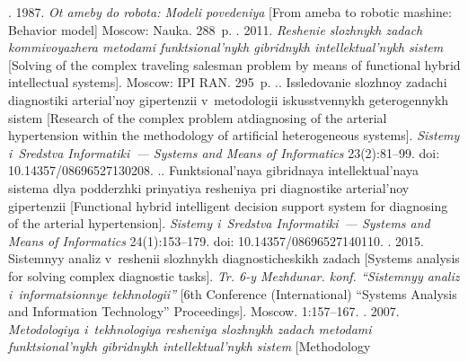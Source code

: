   \begin{multicols}{2}

\renewcommand{\bibname}{\protect\rmfamily References}

{\small\frenchspacing
 {%
 \begin{thebibliography}{99}
. 1987. \textit{Ot ameby do robota: Modeli 
povedeniya} [From ameba to robotic mashine: Behavior model] Moscow: Nauka. 288~p.
. 2011. \textit{Reshenie 
slozhnykh zadach kommivoyazhera metodami funktsional'nykh gibridnykh intellektual'nykh 
sistem} [Solving of the complex traveling salesman problem by means of functional hybrid 
intellectual systems]. Moscow: IPI RAN. 295~p.
.. Issledovanie slozhnoy 
zadachi diagnostiki arterial'noy gipertenzii v~metodologii iskusstvennykh geterogennykh sistem 
[Research of the complex problem at\linebreak diagnosing of the arterial hypertension within the 
methodology of artificial heterogeneous systems]. \textit{Sistemy i~Sredstva Informatiki~--- 
Systems and Means of Informatics} 23(2):81--99. doi: 10.14357/08696527130208.
.. Funktsional'naya 
gibridnaya intellektual'naya sistema dlya podderzhki prinyatiya resheniya pri diagnostike 
arterial'noy gipertenzii [Functional hybrid intelligent decision support system for diagnosing of the 
\mbox{arterial} hypertension]. \textit{Sistemy i~Sredstva Informatiki~--- Systems and Means of Informatics} 
24(1):153--179. doi: 10.14357/08696527140110. 
. 2015. 
Sistemnyy analiz v~reshenii slozhnykh diagnosticheskikh zadach [Systems analysis for solving 
complex diagnostic tasks]. \textit{Tr. 6-y Mezhdunar. konf. ``Sistemnyy analiz i~informatsionnye 
tekhnologii''} [6th Conference (International) ``Systems Analysis and Information Technology'' 
Proceedings]. Moscow.  1:157--167.
. 2007. \textit{Metodologiya i~tekhnologiya resheniya 
slozhnykh zadach metodami funk\-tsi\-o\-nal'\-nykh gibridnykh intellektual'nykh sistem} [Methodology 

\end{thebibliography}}}
\end{multicols}
